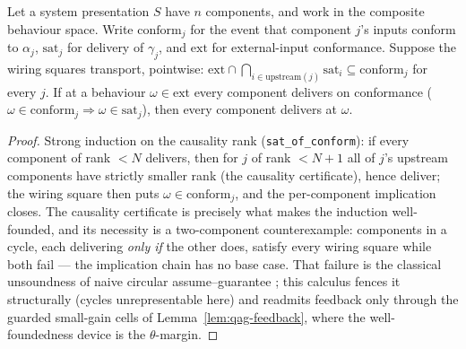 \begin{blemma}
\label{lem:qag-conform}
Let a system presentation $S$ have $n$ components, and work in the
composite behaviour space. Write $\mathrm{conform}_j$ for the event
that component $j$'s inputs conform to $\alpha_j$, $\mathrm{sat}_j$
for delivery of $\gamma_j$, and $\mathrm{ext}$ for external-input
conformance. Suppose the wiring squares transport, pointwise:
$\mathrm{ext} \cap \bigcap_{i \in \mathrm{upstream}(j)} \mathrm{sat}_i
\subseteq \mathrm{conform}_j$ for every $j$. If at a behaviour $\omega
\in \mathrm{ext}$ every component delivers on conformance
($\omega \in \mathrm{conform}_j \Rightarrow \omega \in
\mathrm{sat}_j$), then every component delivers at $\omega$.
\end{blemma}
\begin{proof}
Strong induction on the causality rank (\texttt{sat\_of\_conform}):
if every component of rank $< N$ delivers, then for $j$ of rank $< N{+}1$
all of $j$'s upstream components have strictly smaller rank (the
causality certificate), hence deliver; the wiring square then puts
$\omega \in \mathrm{conform}_j$, and the per-component implication
closes. The causality certificate is precisely what makes the
induction well-founded, and its necessity is a two-component
counterexample: components in a cycle, each delivering \emph{only if}
the other does, satisfy every wiring square while both fail --- the
implication chain has no base case. That failure is the classical
unsoundness of naive circular assume--guarantee
\cite{abadilamport1993, mcmillan1999}; this calculus fences it
structurally (cycles unrepresentable here) and readmits feedback only
through the guarded small-gain cells of
Lemma~\ref{lem:qag-feedback}, where the well-foundedness device is the
$\theta$-margin.
\end{proof}

